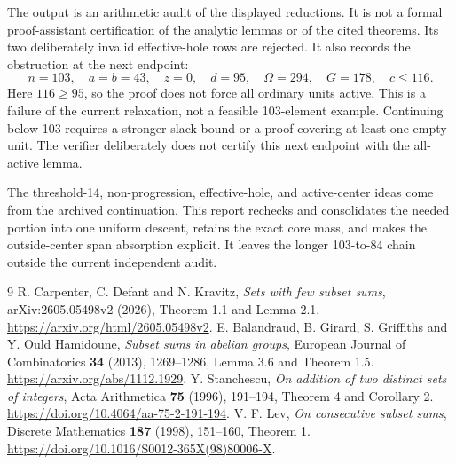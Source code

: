 \documentclass[11pt,a4paper]{article}
\begin{document}
The output is an arithmetic audit of the displayed reductions. It is
not a formal proof-assistant certification of the analytic lemmas or of
the cited theorems. Its two deliberately invalid effective-hole rows are
rejected. It also records the obstruction at the next endpoint:
\[
 n=103,\quad a=b=43,\quad z=0,\quad d=95,\quad
 \Omega=294,\quad G=178,\quad c\le116.
\]
Here $116\ge95$, so the proof does not force all ordinary units active.
This is a failure of the current relaxation, not a feasible 103-element
example. Continuing below 103 requires a stronger slack bound or a proof
covering at least one empty unit. The verifier deliberately does not
certify this next endpoint with the all-active lemma.

The threshold-14, non-progression, effective-hole, and active-center ideas
come from the archived continuation. This report rechecks and consolidates
the needed portion into one uniform descent, retains the exact core mass,
and makes the outside-center span absorption explicit. It leaves the
longer 103-to-84 chain outside the current independent audit.

\begin{thebibliography}{9}
 R. Carpenter, C. Defant and N. Kravitz,
\emph{Sets with few subset sums}, arXiv:2605.05498v2 (2026),
Theorem 1.1 and Lemma 2.1.
\url{https://arxiv.org/html/2605.05498v2}.
 E. Balandraud, B. Girard, S. Griffiths and Y. Ould Hamidoune,
\emph{Subset sums in abelian groups}, European Journal of Combinatorics
\textbf{34} (2013), 1269--1286, Lemma 3.6 and Theorem 1.5.
\url{https://arxiv.org/abs/1112.1929}.
 Y. Stanchescu,
\emph{On addition of two distinct sets of integers},
Acta Arithmetica \textbf{75} (1996), 191--194, Theorem 4 and Corollary 2.
\url{https://doi.org/10.4064/aa-75-2-191-194}.
 V. F. Lev, \emph{On consecutive subset sums},
Discrete Mathematics \textbf{187} (1998), 151--160, Theorem 1.
\url{https://doi.org/10.1016/S0012-365X(98)80006-X}.
\end{thebibliography}
\end{document}
